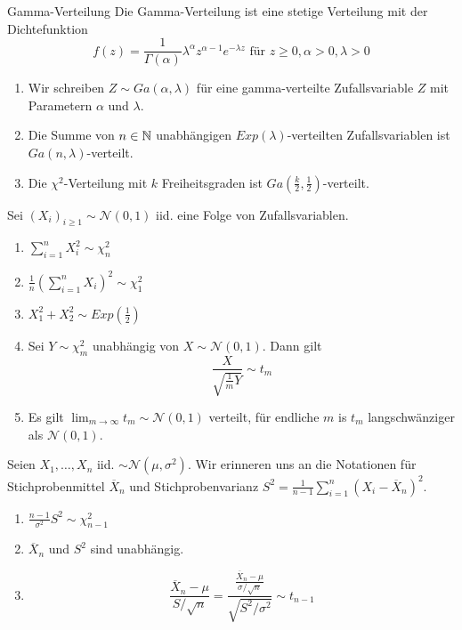 \begin{subbox}{Gamma-Verteilung}
	Die Gamma-Verteilung ist eine stetige Verteilung mit der Dichtefunktion
	\[f(z) = \frac{1}{\Gamma(\alpha)}\lambda^{\alpha}z^{\alpha-1}e^{-\lambda z} \text{ für } z \geq 0, \alpha >0, \lambda > 0\]
	\begin{enumerate}
		\item Wir schreiben $Z \sim Ga(\alpha, \lambda)$ für eine gamma-verteilte Zufallsvariable $Z$ mit Parametern $\alpha$ und $\lambda$.
		\item Die Summe von $n \in \mathbb{N}$ unabhängigen $Exp(\lambda)$-verteilten Zufallsvariablen ist $Ga(n, \lambda)$-verteilt.
		\item Die $\chi^2$-Verteilung mit $k$ Freiheitsgraden ist $Ga\left(\frac{k}{2}, \frac{1}{2}\right)$-verteilt.
	\end{enumerate}
\end{subbox}
Sei $(X_i)_{i \geq 1} \sim \mathcal{N}(0,1)$ iid. eine Folge von Zufallsvariablen.
\begin{enumerate}
	\item $\sum_{i = 1}^{n} X_i^2 \sim \chi^2_n$
	\item $\frac{1}{n}(\sum_{i = 1}^n X_i)^2 \sim \chi_1^2$
	\item $X_1^2 + X_2^2 \sim Exp\left(\frac{1}{2}\right)$
	\item Sei $Y \sim \chi_m^2$ unabhängig von $X \sim \mathcal{N}(0,1)$. Dann gilt \[\frac{X}{\sqrt{\frac{1}{m}Y}} \sim t_m\]
	\item Es gilt $\lim_{m\to\infty} t_m \sim \mathcal{N}(0,1)$ verteilt, für endliche $m$ is $t_m$ langschwänziger als $\mathcal{N}(0,1).$
\end{enumerate}
Seien $X_1, \ldots, X_n$ iid. $\sim \mathcal{N}(\mu, \sigma^2)$.
Wir erinneren uns an die Notationen für Stichprobenmittel $\overline{X}_n$ und Stichprobenvarianz $S^2 = \frac{1}{n-1}\sum_{i = 1}^n(X_i - \overline{X}_n)^2$.
\begin{enumerate}
	\item $\frac{n-1}{\sigma^2}S^2 \sim \chi_{n-1}^2$
	\item $\overline{X}_n$ und $S^2$ sind unabhängig.
	\item \[\frac{\overline{X}_n - \mu}{S/\sqrt{n}} = \frac{\frac{\overline{X}_n - \mu}{\sigma / \sqrt{n}}}{\sqrt{S^2/\sigma^2}} \sim t_{n-1}\]
\end{enumerate}

